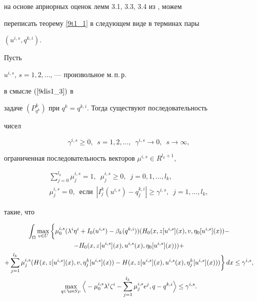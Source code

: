 на основе априорных оценок лемм 3.1, 3.3, 3.4 из \cite{sumin98}, можем


переписать теорему \ref{9t1_1} в следующем виде в терминах пары


$(u^{i,s},q^{k,i})$.





\begin{thms}\label{9t1_2}


Пусть


$u^{i,s}$, $s=1,2,\dotsc$, --- произвольное м.\,п.\,р.


в смысле $(\ref{9dis1_3})$ в


задаче $(P^k_{q^k})$ при $q^k=q^{k,i}$. Тогда существуют последовательность


чисел


$$


\gamma^{i,s}\geq


0,\ \; s=1,2,\dotsc,\ \; \gamma^{i,s}\to 0,\ \;s\to\infty,


$$


ограниченная последовательность векторов $\mu^{i,s}\in R^{l_k+1}$,


\begin{gather*}


\sum_{j=0}^{l_k}\mu_j^{i,s}=1,\ \; \mu^{i,s}_j\geq 0,\ \;


j=0,1,\dotsc,l_k,\\


%


\mu^{i,s}_j=0,\ \;\text{если}


\ \; |I_j^k(u^{i,s})-q_j^{k,i}|\geq\gamma^{i,s},\ \; j=1,\dotsc,l_k,


\end{gather*}


такие, что


\begin{gather*}


\int_\Omega\max_{v\in U}


\bigg\{\mu^{i,s}_0(\lambda^i\eta^i+I_0(u^{i,s})-


\beta_k(q^{k,i}))(H_0(x,z[u^{i,s}](x),v,\eta_0[u^{i,s}](x))- \\


%


- H_0(x,z[u^{i,s}](x),u^{i,s}(x),\eta_0[u^{i,s}](x)))+ \\


%


+\sum_{j=1}^{l_k}\mu^{i,s}_j(H(x,z[u^{i,s}](x),v,\eta_j^k[u^{i,s}](x))-


H(x,z[u^{i,s}](x),u^{i,s}(x),\eta_j^k[u^{i,s}](x)))\bigg\}\,dx


\leq\gamma^{i,s}, \\


%


\max_{q\in\ov S_P}\Big\langle -\mu^{i,s}_0\lambda^i\zeta^i-


\sum_{j=1}^{l_k}\mu^{i,s}_je^j,q-q^{k,i}\Big\rangle\le \gamma^{i,s}.


\end{gather*}


\end{thms}





